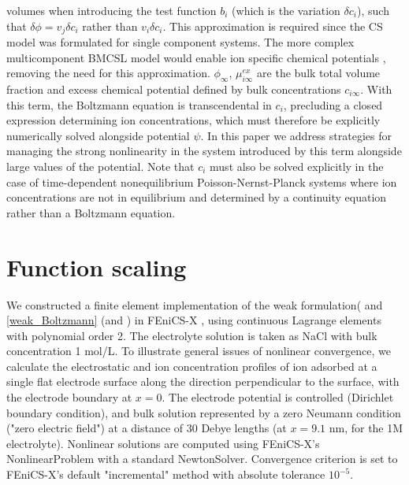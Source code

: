 volumes when introducing the test function $b_i$ (which is the
variation $\delta c_i$), such that $\delta\phi=v_j \delta c_i$ rather
than $v_i \delta c_i$. This approximation is required since the CS
model was formulated for single component systems. The more complex
multicomponent BMCSL model would enable ion specific chemical
potentials \cite{MansooriCarnahanStarlingLeland1971}, removing the
need for this approximation.  $\phi_{\infty}$, $\mu_{i\infty}^{ex}$
are the bulk total volume fraction and excess chemical potential
defined by bulk concentrations $c_{i\infty}$. With this term, the
Boltzmann equation is transcendental in $c_i$, precluding a closed
expression determining ion concentrations, which must therefore be
explicitly numerically solved alongside potential $\psi$. In this
paper we address strategies for managing the strong nonlinearity in
the system introduced by this term alongside large values of the
potential. Note that $c_i$ must also be solved explicitly in the case
of time-dependent nonequilibrium Poisson-Nernst-Planck systems where
ion concentrations are not in equilibrium and determined by a
continuity equation rather than a Boltzmann equation.

\section{Function scaling}
We constructed a finite element implementation of the weak
formulation( and \ref{weak_Boltzmann} (and
) in FEniCS-X \cite{baratta2023dolfinx}, using continuous
Lagrange elements with polynomial order 2.  The electrolyte solution
is taken as NaCl with bulk concentration 1 mol/L.  To illustrate
general issues of nonlinear convergence, we calculate the
electrostatic and ion concentration profiles of ion adsorbed at a
single flat electrode surface along the direction perpendicular to the
surface, with the electrode boundary at $x=0$.  The electrode
potential is controlled (Dirichlet boundary condition), and bulk
solution represented by a zero Neumann condition ("zero electric
field") at a distance of 30 Debye lengths (at $x=9.1$ nm, for the 1M
electrolyte). Nonlinear solutions are computed using FEniCS-X's
NonlinearProblem with a standard NewtonSolver. Convergence criterion
is set to FEniCS-X's default "incremental" method with absolute
tolerance $10^{-5}$.

